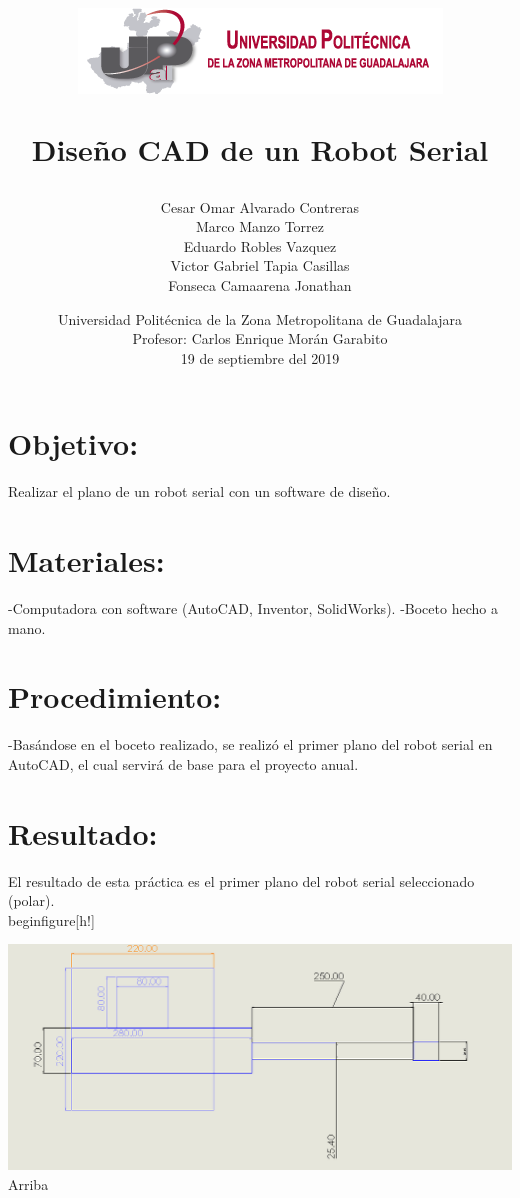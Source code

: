 \documentclass[12pt,a4paper]{report}
\begin{document}
\author{Cesar Omar Alvarado Contreras\\
Marco Manzo Torrez\\
Eduardo Robles Vazquez\\
Victor Gabriel Tapia Casillas\\
Fonseca Camaarena Jonathan}

\title{\begin{center}
\includegraphics[scale=1.5]{Escudo.png} 
\end{center}Diseño CAD de un Robot Serial}

\date{
Universidad Politécnica de la Zona Metropolitana de Guadalajara\\
Profesor: Carlos Enrique Morán Garabito\\
19 de septiembre del 2019}

\maketitle
\section{Objetivo:}
Realizar el plano de un robot serial con un software de diseño.
\section{Materiales:}
-Computadora con software (AutoCAD, Inventor, SolidWorks).
-Boceto hecho a mano.

\section{Procedimiento:}
-Basándose en el boceto realizado, se realizó el primer plano del robot serial en AutoCAD, el cual servirá de base para el proyecto anual.
\section{Resultado:}
El resultado de esta práctica es el primer plano del robot serial seleccionado (polar).\\
begin{figure}[h!]
\begin{center}
\includegraphics[scale=.6]{DibujoCAD4.png}
Arriba
\end{center}
\end{document}
